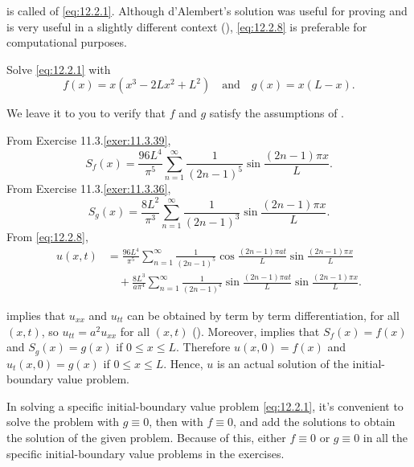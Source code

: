  is called
of \eqref{eq:12.2.1}. Although
d'Alembert's solution   was useful
for proving  and is very useful in a slightly
different context (),
\eqref{eq:12.2.8} is preferable for computational purposes.



\begin{example}\label{example:12.2.1}
Solve \eqref{eq:12.2.1} with
\[
f(x)=x(x^3-2Lx^2+L^2)
\quad\text{and}\quad
g(x)=x(L-x).
\]
\end{example}

\begin{solution}
We leave it to you to verify that $f$ and $g$ satisfy the assumptions
of .

From {Exercise 11.3.\ref{exer:11.3.39}},
\[
S_f(x)=\frac{96L^4}{\pi^5}\sum_{n=1}^\infty\frac{1}{(2n-1)^5}\sin\frac{(2n-1)\pi
x}{L}.
\]
From {Exercise 11.3.\ref{exer:11.3.36}},
\[
S_g(x)=\frac{8L^2}{\pi^3}\sum_{n=1}^\infty\frac{1}{(2n-1)^3}\sin\frac{(2n-1)\pi
x}{L}.
\]
From \eqref{eq:12.2.8},
\begin{align*}
u(x,t)
&=
\frac{96L^4}{\pi^5}\sum_{n=1}^\infty\frac{1}{(2n-1)^5}
\cos\frac{(2n-1)\pi a t}{L}\sin\frac{(2n-1)\pi x}{L}
\\&\quad{}+
\frac{8L^3}{a\pi^4}\sum_{n=1}^\infty\frac{1}{(2n-1)^4}
\sin\frac{(2n-1)\pi a t}{L}\sin\frac{(2n-1)\pi x}{L}.
\end{align*}

  implies that $u_{xx}$
and $u_{tt}$    can be obtained by term
by term differentiation, for all
$(x,t)$, so $u_{tt}=a^2u_{xx}$ for all
$(x,t)$ (). Moreover,
implies that $S_f(x)=f(x)$ and $S_g(x)=g(x)$ if $0\le x\le L$. Therefore
$u(x,0)=f(x)$ and $u_t(x,0)=g(x)$ if $0\le x\le L$.
Hence, $u$ is an actual solution of the initial-boundary
value problem.
\end{solution}

\medskip

\begin{remark*}
In solving a specific initial-boundary value problem \eqref{eq:12.2.1},
it's convenient to solve the problem with $g\equiv0$, then with
$f\equiv0$, and add the solutions to obtain the solution of the given
problem. Because of this, either $f\equiv0$ or $g\equiv0$ in all
the specific initial-boundary value problems in the exercises.
\end{remark*}


